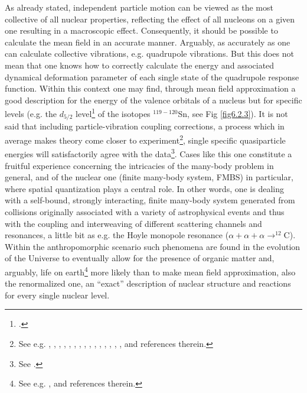   As already stated, independent particle motion can be viewed as the most collective of all nuclear properties, reflecting the effect of all nucleons on a given one resulting in a macroscopic effect. Consequently, it should be possible to calculate the mean field in an accurate manner. Arguably, as accurately as one can calculate collective vibrations, e.g. quadrupole vibrations. But this does not mean that one knows how to correctly calculate the energy and associated dynamical deformation parameter of each single state of the quadrupole response function. Within this context one may find, through mean field approximation a good description for the energy of the valence orbitals of a nucleus but for  specific levels (e.g. the $d_{5/2}$ level\footnote{\cite{Idini:15}.} of the isotopes $^{119-120}$Sn, see Fig \ref{fig6.2.3}). It is not said that  including  particle-vibration coupling corrections, a process which in average makes theory come closer to experiment\footnote{See e.g. \cite{Bohr:75}, \cite{Bohr:77}, \cite{Hamamoto:77}, \cite{Bes:77c}, \cite{Barnes:72}, \cite{Reich:74}, \cite{Hamamoto:76}, \cite{Bortignon:77}, \cite{Bernard:81}, \cite{Mahaux:85}, \cite{Bes:71,Flynn:71}, \cite{Bortignon:76}, \cite{Bes:88}, \cite{Barranco:87b}, \cite{Vinh:95}, \cite{Barranco:01,Orrigo:09} and references therein.}, single specific quasiparticle energies will satisfactorily agree  with the data\footnote{See \cite{Tarpanov:14}.}. Cases like this one constitute a fruitful experience concerning the intricacies of the many-body problem in general, and of the nuclear one (finite many-body system, FMBS) in particular, where spatial quantization plays a central role. In other words, one is dealing with a self-bound, strongly interacting, finite many-body system generated from collisions originally associated  with a variety of astrophysical events and thus with  the coupling and interweaving of different scattering channels and resonances, a little bit as e.g. the Hoyle monopole resonance ($\alpha+\alpha+\alpha\rightarrow^{12}$C). Within the anthropomorphic  scenario such phenomena are found in the evolution of the Universe to eventually allow for the presence of organic matter and, arguably, life on earth\footnote{See e.g. \cite{Rees:00}, \cite{Meissner:15} and references therein.} more likely than to make mean field approximation, also the renormalized one, an ``exact'' description of nuclear structure and reactions for every single nuclear level.
 


